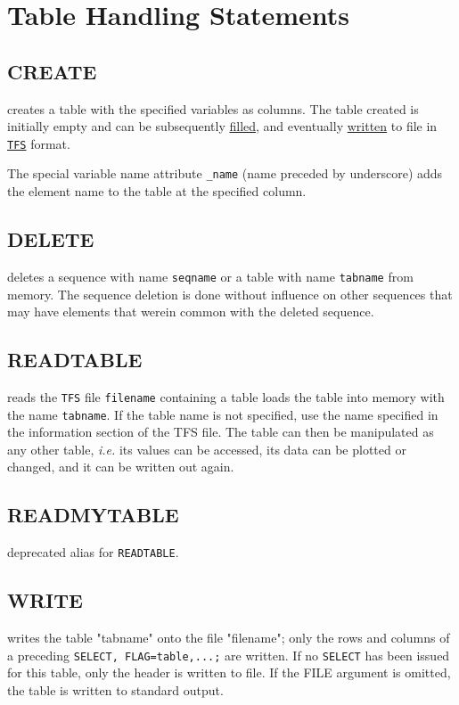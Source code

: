 \chapter{Table Handling Statements} 
\label{chap:tables}

\section{CREATE}
\label{sec:create}
creates a table with the specified variables as columns. 
The table created is initially empty and can be subsequently
\hyperref[sec:fill]{filled}, and eventually
\hyperref[sec:write]{written} to file in
\hyperref[chap:tfs]{\texttt{TFS}} format.

The special variable name attribute \texttt{\_name} (name preceded by
underscore) adds the element name to the table at the specified column. 


\section{DELETE}
\label{sec:delete}
deletes a sequence with name \texttt{seqname} or a table with name
\texttt{tabname} from memory. The sequence deletion is done without
influence on other sequences that may have elements that werein common
with the deleted sequence.

\section{READTABLE}
\label{sec:readtable}
reads the \texttt{TFS} file \texttt{filename} containing a \mad table
loads the table into memory with the name \texttt{tabname}. If the table
name is not specified, use the name specified in the
information section of the TFS file. The table can then be manipulated
as any other table, \textsl{i.e.} its values can be accessed, its data
can be plotted or changed, and it can be written out again. 

\section{READMYTABLE}
\label{sec:readmytable}
deprecated alias for \texttt{READTABLE}.

\section{WRITE}
\label{sec:write}
writes the table "tabname" onto the file "filename"; only the rows and
columns of a preceding \texttt{SELECT, FLAG=table,...;} are written. 
If no \texttt{SELECT} has been issued for this table, only the header is
written to file.
If the FILE argument is omitted, the table is written to standard output.  


